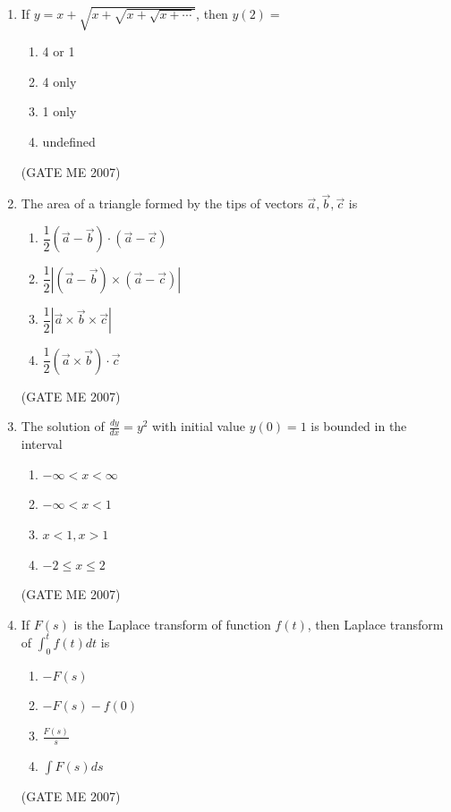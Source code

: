 \documentclass[journal]{IEEEtran}
\begin{document}
\begin{enumerate}
\item If $ y = x + \sqrt{x + \sqrt{x + \sqrt{x + \cdots}}} $, then $ y(2) = $
\begin{multicols}{4}
\begin{enumerate}
\item 4 or 1
\item 4 only
\item 1 only
\item undefined
\end{enumerate}
\end{multicols}
\hfill (GATE ME 2007)

\item The area of a triangle formed by the tips of vectors $ \vec{a}, \vec{b}, \vec{c} $ is
\begin{multicols}{2}
\begin{enumerate}
\item $\dfrac{1}{2} (\vec{a} - \vec{b}) \cdot (\vec{a} - \vec{c})$
\item $\dfrac{1}{2} \left| (\vec{a} - \vec{b}) \times (\vec{a} - \vec{c}) \right|$
\item $\dfrac{1}{2} \left| \vec{a} \times \vec{b} \times \vec{c} \right|$
\item $\dfrac{1}{2} (\vec{a} \times \vec{b}) \cdot \vec{c}$
\end{enumerate}
\end{multicols}
\hfill (GATE ME 2007)

\item The solution of $ \frac{dy}{dx} = y^2 $ with initial value $ y(0) = 1 $ is bounded in the interval
\begin{multicols}{4}
\begin{enumerate}
\item $ -\infty < x < \infty $
\item $ -\infty < x < 1 $
\item $ x < 1, x > 1 $
\item $ -2 \leq x \leq 2 $
\end{enumerate}
\end{multicols}
\hfill (GATE ME 2007)

\item If $ F(s) $ is the Laplace transform of function $ f(t) $, then Laplace transform of $ \int_0^t f(t) dt $ is
\begin{multicols}{4}
\begin{enumerate}
\item $ -F(s) $
\item $ -F(s) - f(0) $
\item $ \frac{F(s)}{s} $
\item $ \int F(s) ds $
\end{enumerate}
\end{multicols}
\hfill (GATE ME 2007)


\end{enumerate}
\end{document}
